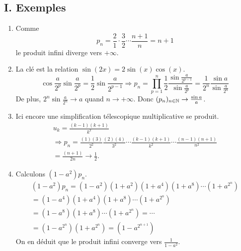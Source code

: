 \subsection*{I. Exemples}
\begin{enumerate}
\item  Comme 
\[
 p_{n}=\frac{2}{1}\cdot \frac{3}{2}\cdots \frac{n+1}{n}=n+1
\]
le produit infini diverge vers $+ \infty $.

 \item  La clé est la relation $\sin(2x) = 2 \sin(x) \cos(x)$. 
\[
\cos \frac{a}{2^{p}}\sin \frac{a}{2^{p}}=\frac{1}{2}\sin \frac{a}{2^{p-1}} 
\Rightarrow
p_{n}=\prod_{p=1}^{n}\frac{1}{2}\frac{\sin \frac{a}{2^{p-1}}}{\sin \frac{a}{2^{p}}}=\frac{1}{2^{n}}\frac{\sin a}{\sin \frac{a}{2^{n}}}
\]
De plus, $2^{n}\sin \frac{a}{2^{n}}\rightarrow a$ quand $n\rightarrow +\infty $. Donc $(p_{n})_{n\in \mathbb{N}}\rightarrow \frac{\sin a}{a}$.

 \item Ici encore une simplification télescopique multiplicative se produit.
\begin{multline*}
 u_k = \frac{(k-1)(k+1)}{k^2} \\\Rightarrow
 p_n = \frac{(1)(3)}{2^2} \frac{(2)(4)}{3^2}\cdots \frac{(k-1)(k+1)}{k^2} \cdots \frac{(n-1)(n+1)}{n^2}\\
  = \frac{(n+1)}{2n} \rightarrow \frac{1}{2}.
\end{multline*}

 \item Calculons $(1-a^{2})p_{n}$.
\begin{multline*}
(1-a^{2})p_{n}  = (1-a^{2})(1+a^{2})(1+a^{4})(1+a^{8})\cdots (1+a^{2^{n}})\\ 
 = (1-a^{4})(1+a^{4})(1+a^{8})\cdots (1+a^{2^{n}}) \\
 = (1-a^{8})(1+a^{8})\cdots (1+a^{2^{n}}) 
 = \cdots  \\
 = (1-a^{2^{n}})(1+a^{2^{n}})=(1-a^{2^{n+1}})
\end{multline*}
On en d\'{e}duit que le produit infini converge vers $\frac{1}{1-a^{2}}$.

\end{enumerate}

